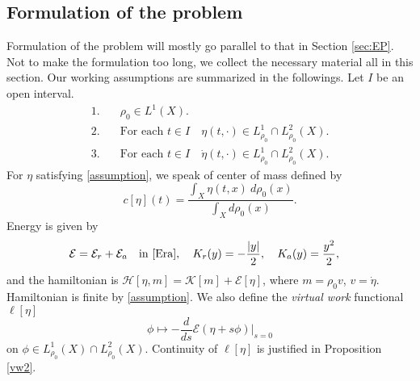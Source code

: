 \documentclass[10pt, letterpaper]{article}
\def\E{{\mathcal{E}}}
\def\H{{\mathcal{H}}}
\def\K{{\mathcal{K}}}
\def\dr{{d\rho_0(x)}}
\theoremstyle{definition}
\theoremstyle{remark}
\begin{document}
\subsection{Formulation of the problem}
Formulation of the problem will mostly go parallel to that in Section \ref{sec:EP}. Not to make the formulation too long, we collect the necessary material all in this section. Our working assumptions are summarized in the followings. Let $I$ be an open interval.
\begin{equation} \label{assumption}\tag{A}
 \begin{aligned}
  1.& \quad \rho_0 \in L^1(X).\\
  2.& \quad \text{For each $t\in I$} \quad \eta(t,\cdot) \in L^1_{\rho_0}\cap L^2_{\rho_0}(X).\\
  3.& \quad \text{For each $t\in I$} \quad \dot{\eta}(t,\cdot) \in L^1_{\rho_0}\cap L^2_{\rho_0}(X). 
 \end{aligned}
\end{equation}
For $\eta$ satisfying \eqref{assumption}, we speak of center of mass defined by
$$ c[\eta](t) = \frac{\int_X \eta(t,x) \:\dr}{\int_X \dr}.$$
Energy is given by 
\begin{align*}
 &\E = \E_r + \E_a \quad \text{in \eqref{Era}}, \quad K_r(y) = - \frac{|y|}{2}, \quad K_a(y) = \frac{y^2}{2},\end{align*}
and the hamiltonian is $\H[\eta,m] = \K[m] + \E[\eta]$, where $m= \rho_0v$, $v=\dot{\eta}$. Hamiltonian is finite by \eqref{assumption}. We also define the {\it virtual work} functional $\ell[\eta]$ 
$$ \phi \mapsto -\frac{d}{ds} \E(\eta + s\phi) \Big|_{s=0}$$
on $\phi\in L^1_{\rho_0}(X) \cap L^2_{\rho_0}(X)$. Continuity of $\ell[\eta]$ is justified in Proposition \ref{vw2}. 
\end{document}
